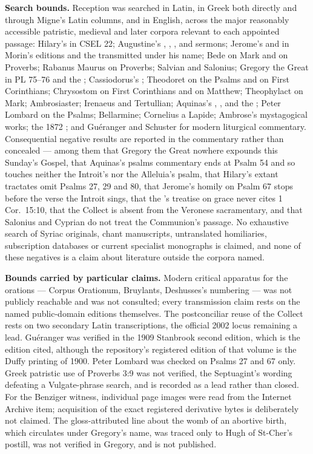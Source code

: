 \textbf{Search bounds.} Reception was searched in Latin, in Greek both directly
and through Migne's Latin columns, and in English, across the major reasonably
accessible patristic, medieval and later corpora relevant to each appointed
passage: Hilary's  in CSEL 22; Augustine's
, , , and sermons; Jerome's  and
 in Morin's editions and the 
transmitted under his name; Bede on Mark and on Proverbs; Rabanus Maurus on
Proverbs; Salvian and Salonius; Gregory the Great in PL 75--76 and the
; Cassiodorus's ; Theodoret on the
Psalms and on First Corinthians; Chrysostom on First Corinthians and on
Matthew; Theophylact on Mark; Ambrosiaster; Irenaeus and Tertullian; Aquinas's
, ,  and the ; Peter Lombard on the Psalms;
Bellarmine; Cornelius a Lapide; Ambrose's mystagogical works; the 1872
; and Guéranger and Schuster for modern liturgical
commentary. Consequential negative results are reported in the commentary
rather than concealed --- among them that Gregory the Great nowhere expounds
this Sunday's Gospel, that Aquinas's psalms commentary ends at Psalm 54 and so
touches neither the Introit's nor the Alleluia's psalm, that Hilary's extant
tractates omit Psalms 27, 29 and 80, that Jerome's homily on Psalm 67 stops
before the verse the Introit sings, that the 's treatise on grace
never cites 1 Cor.~15:10, that the Collect is absent from the Veronese
sacramentary, and that Salonius and Cyprian do not treat the Communion's
passage. No exhaustive search of Syriac originals, chant manuscripts,
untranslated homiliaries, subscription databases or current specialist
monographs is claimed, and none of these negatives is a claim about literature
outside the corpora named.

\textbf{Bounds carried by particular claims.} Modern critical apparatus for the
orations --- Corpus Orationum, Bruylants, Deshusses's numbering --- was not
publicly reachable and was not consulted; every transmission claim rests on the
named public-domain editions themselves. The postconciliar reuse of the Collect
rests on two secondary Latin transcriptions, the official 2002 locus remaining
a lead. Guéranger was verified in the 1909 Stanbrook second edition, which is
the edition cited, although the repository's registered edition of that volume
is the Duffy printing of 1900. Peter Lombard was checked on Psalms 27 and 67
only. Greek patristic use of Proverbs 3:9 was not verified, the Septuagint's
wording defeating a Vulgate-phrase search, and is recorded as a lead rather
than closed. For the Benziger witness, individual page images were read from the
Internet Archive item; acquisition of the exact registered derivative bytes is
deliberately not claimed. The gloss-attributed line about the womb of an
abortive birth, which circulates under Gregory's name, was traced only to Hugh
of St-Cher's postill, was not verified in Gregory, and is not published.


